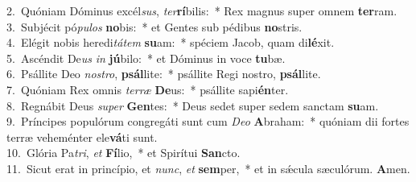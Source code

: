 {2.~}Quóniam Dóminus excél\textit{sus}, \textit{ter}\textbf{rí}bilis:~* Rex magnus super omnem \textbf{ter}ram.\\
{3.~}Subjécit pó\textit{pu}\textit{los} \textbf{no}bis:~* et Gentes sub pédibus \textbf{no}stris.\\
{4.~}Elégit nobis heredi\textit{tá}\textit{tem} \textbf{su}am:~* spéciem Jacob, quam di\textbf{lé}xit.\\
{5.~}Ascéndit De\textit{us} \textit{in} \textbf{jú}bilo:~* et Dóminus in voce \textbf{tu}bæ.\\
{6.~}Psállite Deo \textit{no}\textit{stro}, \textbf{psál}lite:~* psállite Regi nostro, \textbf{psál}lite.\\
{7.~}Quóniam Rex omnis \textit{ter}\textit{ræ} \textbf{De}us:~* psállite sapi\textbf{én}ter.\\
{8.~}Regnábit Deus \textit{su}\textit{per} \textbf{Gen}tes:~* Deus sedet super sedem sanctam \textbf{su}am.\\
{9.~}Príncipes populórum congregáti sunt cum \textit{De}\textit{o} \textbf{A}braham:~* quóniam dii fortes terræ veheménter ele\textbf{vá}ti sunt.\\
{10.~}Glória Pa\textit{tri}, \textit{et} \textbf{Fí}lio,~* et Spirítui \textbf{San}cto.\\
{11.~}Sicut erat in princípio, et \textit{nunc}, \textit{et} \textbf{sem}per,~* et in sǽcula sæculórum. \textbf{A}men.\\
